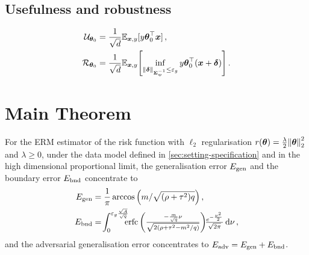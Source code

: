 \documentclass[a0paper,fleqn]{betterportraitposter}
\theoremstyle{plain}
\theoremstyle{definition}
\theoremstyle{remark}
\begin{document}
{\begin{multicols}{3}
\subsection{Usefulness and robustness}
\begin{align}
   \mathcal{U}_{\boldsymbol{\theta}_0}
   &= \frac{1}{\sqrt{d}} \mathbb{E}_{\boldsymbol{x}, y}[y \boldsymbol{\theta}_0^\top \boldsymbol{x} ] \,, \label{eq:mt-usefulness-def} \\
   \mathcal{R}_{\boldsymbol{\theta}_0} &= \frac{1}{\sqrt{d}} \mathbb{E}_{\boldsymbol{x}, y}\qty[
       \inf_{\norm{\boldsymbol{\delta}}_{\boldsymbol{\Sigma}_{\boldsymbol{\upsilon}}^{-1}}  \leq \varepsilon_g} y \boldsymbol{\theta}_0^\top ( \boldsymbol{x} + \boldsymbol{\delta})
   ]\,. \label{eq:mt-robustness-def}
\end{align}

\section{Main Theorem}
For the ERM estimator of the risk function with \(\ell_2\) regularisation \(r(\boldsymbol{\theta}) = \frac{\lambda}{2} \norm{\boldsymbol{\theta}}_2^2\) and \(\lambda \geq 0\), under the data model defined in \cref{sec:setting-specification} and in the high dimensional proportional limit, the generalisation error \(E_{\mathrm{gen}}\) and the boundary error \(E_{\mathrm{bnd}}\) concentrate to
\begin{align}
    E_{\mathrm{gen}} &= \frac{1}{\pi} \arccos \qty( 
    {
        m / \sqrt{ (\rho + \tau^2) q}
    } 
    ) \,, \\
    E_{\mathrm{bnd}} &= \!
    \int_{0}^{\varepsilon_g \frac{\sqrt{A}}{\sqrt{q}}} \!\!\!\!
    {\textstyle
        \operatorname*{erfc}\left( \frac{ -\frac{m}{\sqrt{q}} \nu}{\sqrt{2 \qty(\rho + \tau^2 - m^2 / q)}} \right) 
        \!\! \frac{e^{-\frac{\nu^2}{2}}}{\sqrt{2\pi}} \dd{\nu}
    }
    \label{eq:adv-error-theorem-overlap} \,, 
\end{align}
and the adversarial generalisation error concentrates to \(E_{\mathrm{adv}} = E_{\mathrm{gen}} + E_{\mathrm{bnd}}\).


\end{multicols}}
\end{document}

